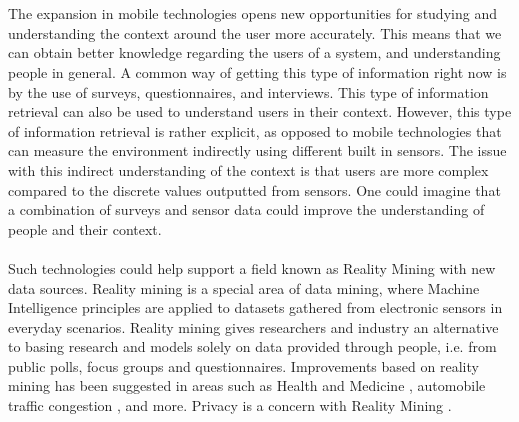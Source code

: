 \\\\
The expansion in mobile technologies opens new opportunities for studying and understanding the context around the user more accurately. This means that we can obtain better knowledge regarding the users of a system, and understanding people in general. A common way of getting this type of information right now is by the use of surveys, questionnaires, and interviews. This type of information retrieval can also be used to understand users in their context. However, this type of information retrieval is rather explicit, as opposed to mobile technologies that can measure the environment indirectly using different built in sensors. The issue with this indirect understanding of the context is that users are more complex compared to the discrete values outputted from sensors. One could imagine that a combination of surveys and sensor data could improve the understanding of people and their context.
\\\\
Such technologies could help support a field known as Reality Mining \parencite{eagle2006_reality_mining_definition} with new data sources. Reality mining is a special area of data mining, where Machine Intelligence principles are applied to datasets gathered from electronic sensors in everyday scenarios. Reality mining gives researchers and industry an alternative to basing research and models solely on data provided through people, i.e. from public polls, focus groups and questionnaires. Improvements based on reality mining has been suggested in areas such as Health and Medicine \parencite{pentland2009_reality_mining_health_medicine}, automobile traffic congestion \parencite{pentland2009reality_mining_mobile_communication_gps}, and more. Privacy is a concern with Reality Mining \parencite{madan2009_reality_mining_privacy}.      
\\\\
